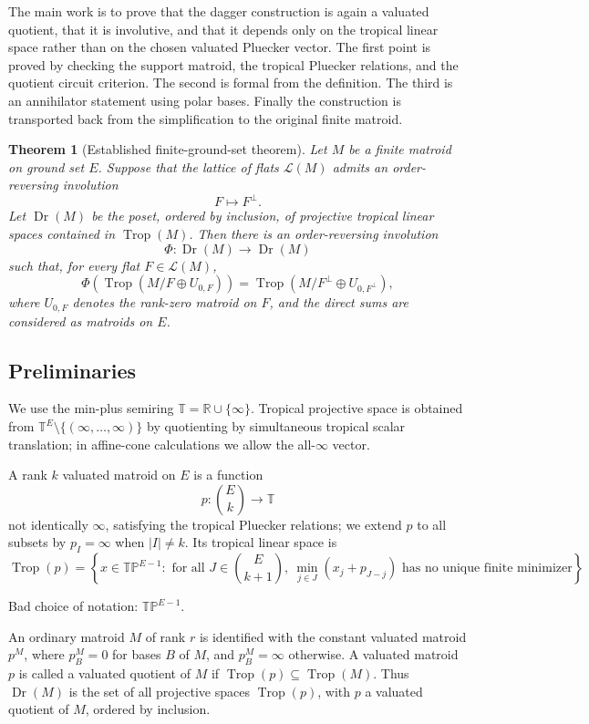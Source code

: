 \documentclass[12pt]{article}
\newtheorem{theorem}{Theorem}
\theoremstyle{definition}
\newcommand{\T}{\mathbb T}
\newcommand{\TP}{\mathbb{TP}}
\newcommand{\Trop}{\operatorname{Trop}}
\newcommand{\Dr}{\operatorname{Dr}}
\newcommand{\cL}{\mathcal L}
\newcommand{\binomE}[1]{\binom{E}{#1}}
\newcommand{\review}[1]{\begin{reviewbox}#1\end{reviewbox}}
\begin{document}
The main work is to prove that the dagger construction is again a valuated quotient, that it is involutive, and that it depends only on the tropical linear space rather than on the chosen valuated Pluecker vector.  The first point is proved by checking the support matroid, the tropical Pluecker relations, and the quotient circuit criterion.  The second is formal from the definition.  The third is an annihilator statement using polar bases.  Finally the construction is transported back from the simplification to the original finite matroid.

\begin{theorem}[Established finite-ground-set theorem]\label{thm:main}
Let \(M\) be a finite matroid on ground set \(E\).  Suppose that the lattice of flats \(\cL(M)\) admits an order-reversing involution
\[
F\longmapsto F^\perp .
\]
Let \(\Dr(M)\) be the poset, ordered by inclusion, of projective tropical linear spaces contained in \(\Trop(M)\).  Then there is an order-reversing involution
\[
\Phi:\Dr(M)\longrightarrow \Dr(M)
\]
such that, for every flat \(F\in \cL(M)\),
\[
\Phi\!\left(\Trop(M/F\oplus U_{0,F})\right)
=
\Trop(M/F^\perp\oplus U_{0,F^\perp}),
\]
where \(U_{0,F}\) denotes the rank-zero matroid on \(F\), and the direct sums are considered as matroids on \(E\).
\end{theorem}

\subsection*{Preliminaries}

We use the min-plus semiring \(\T=\mathbb R\cup\{\infty\}\).  Tropical projective space is obtained from \(\T^E\setminus\{(\infty,\ldots,\infty)\}\) by quotienting by simultaneous tropical scalar translation; in affine-cone calculations we allow the all-\(\infty\) vector.

A rank \(k\) valuated matroid on \(E\) is a function
\[
p:\binom{E}{k}\to \T
\]
not identically \(\infty\), satisfying the tropical Pluecker relations; we extend \(p\) to all subsets by \(p_I=\infty\) when \(|I|\ne k\).  Its tropical linear space is
\[
\Trop(p)=
\left\{
x\in \TP^{E-1}:
\text{ for all }J\in\binomE{k+1},\ 
\min_{j\in J}(x_j+p_{J-j})\text{ has no unique finite minimizer}
\right\}.
\]
\review{Bad choice of notation: $\TP^{E-1}$.}
An ordinary matroid \(M\) of rank \(r\) is identified with the constant valuated matroid \(p^M\), where \(p^M_B=0\) for bases \(B\) of \(M\), and \(p^M_B=\infty\) otherwise.  A valuated matroid \(p\) is called a valuated quotient of \(M\) if \(\Trop(p)\subseteq \Trop(M)\).  Thus \(\Dr(M)\) is the set of all projective spaces \(\Trop(p)\), with \(p\) a valuated quotient of \(M\), ordered by inclusion.
\end{document}
